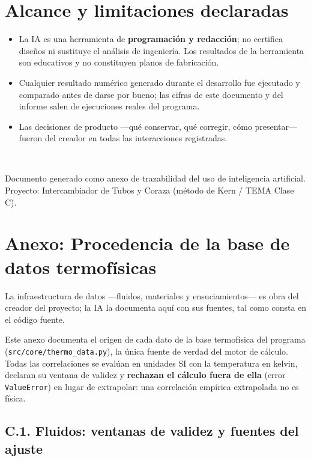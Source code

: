\documentclass[11pt,a4paper]{article}
\begin{document}
\section{Alcance y limitaciones declaradas}

\begin{itemize}
\item La IA es una herramienta de \textbf{programación y redacción}; no
certifica diseños ni sustituye el análisis de ingeniería. Los resultados de
la herramienta son educativos y no constituyen planos de fabricación.
\item Cualquier resultado numérico generado durante el desarrollo fue
ejecutado y comparado antes de darse por bueno; las cifras de este documento
y del informe salen de ejecuciones reales del programa.
\item Las decisiones de producto —qué conservar, qué corregir, cómo
presentar— fueron del creador en todas las interacciones registradas.
\end{itemize}

\vspace{0.6cm}
\noindent{\color{acento}\rule{\linewidth}{2pt}}\\[0.3cm]
{\small\color{gristexto}\raggedright Documento generado como anexo de trazabilidad del uso
de inteligencia artificial. Proyecto: Intercambiador de Tubos y Coraza
(método de Kern / TEMA Clase C).}

\section*{Anexo: Procedencia de la base de datos termof\'isicas}

La infraestructura de datos ---fluidos, materiales y ensuciamientos---
es obra del creador del proyecto; la IA la documenta aqu\'i con sus
fuentes, tal como consta en el c\'odigo fuente.


Este anexo documenta el origen de cada dato de la base termof\'isica del
programa (\texttt{src/core/thermo\_data.py}), la \'unica fuente de
verdad del motor de c\'alculo. Todas las correlaciones se eval\'uan en
unidades SI con la temperatura en kelvin, declaran su ventana de validez y
\textbf{rechazan el c\'alculo fuera de ella} (error \texttt{ValueError})
en lugar de extrapolar: una correlaci\'on emp\'irica extrapolada no es
f\'isica.

\subsection*{C.1. Fluidos: ventanas de validez y fuentes del ajuste}
\end{document}
